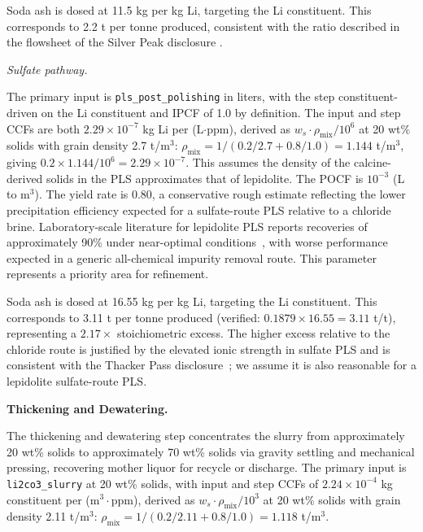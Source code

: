 Soda ash is dosed at 11.5 kg  per kg Li, targeting the Li constituent. This corresponds to 2.2 t  per tonne  produced, consistent with the ratio described in the flowsheet of the Silver Peak disclosure \cite{srkconsultingSECTechnicalReport2023a}.
 
\medskip
\noindent\textit{Sulfate pathway.}\quad
 
The primary input is \texttt{pls\_post\_polishing} in liters, with the step constituent-driven on the Li constituent and IPCF of 1.0 by definition. The input and step CCFs are both $2.29 \times 10^{-7}$ kg Li per (L$\cdot$ppm), derived as $w_s \cdot \rho_\text{mix} / 10^6$ at 20 wt\% solids with grain density 2.7 t/m$^3$: $\rho_\text{mix} = 1/(0.2/2.7 + 0.8/1.0) = 1.144$ t/m$^3$, giving $0.2 \times 1.144 / 10^6 = 2.29 \times 10^{-7}$. This assumes the density of the calcine-derived solids in the PLS approximates that of lepidolite. The POCF is $10^{-3}$ (L to m$^3$). The yield rate is 0.80, a conservative rough estimate reflecting the lower precipitation efficiency expected for a sulfate-route PLS relative to a chloride brine. Laboratory-scale literature for lepidolite PLS reports recoveries of approximately 90\% under near-optimal conditions~\cite{dengSystematicReviewSulfate2026}, with worse performance expected in a generic all-chemical impurity removal route. This parameter represents a priority area for refinement.
 
Soda ash is dosed at 16.55 kg  per kg Li, targeting the Li constituent. This corresponds to 3.11 t  per tonne  produced (verified: $0.1879 \times 16.55 = 3.11$ t/t), representing a $2.17\times$ stoichiometric excess. The higher excess relative to the chloride route is justified by the elevated ionic strength in sulfate PLS and is consistent with the Thacker Pass disclosure~\cite{sgscanadaincSK1300Technical2024}; we assume it is also reasonable for a lepidolite sulfate-route PLS.

\medskip
\noindent\textbf{Thickening and Dewatering.}\quad

The thickening and dewatering step concentrates the  slurry from approximately 20 wt\% solids to approximately 70 wt\% solids via gravity settling and mechanical pressing, recovering mother liquor for recycle or discharge. The primary input is \texttt{li2co3\_slurry} at 20 wt\% solids, with input and step CCFs of $2.24 \times 10^{-4}$ kg constituent per (m$^3 \cdot$ppm), derived as $w_s \cdot \rho_\text{mix} / 10^3$ at 20 wt\% solids with  grain density 2.11 t/m$^3$: $\rho_\text{mix} = 1/(0.2/2.11 + 0.8/1.0) = 1.118$ t/m$^3$.
 
